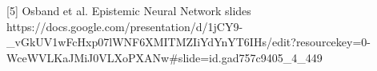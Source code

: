 \documentclass[preview]{standalone}
\begin{document}
\begin{center}
[5] Osband et al. Epistemic Neural Network slides\\https://docs.google.com/presentation/d/1jCY9-_vGkUV1wFcHxp07lWNF6XMITMZIiYdYnYT6IHs/edit?resourcekey=0-WceWVLKaJMiJ0VLXoPXANw#slide=id.gad757c9405_4_449
\end{center}
\end{document}
